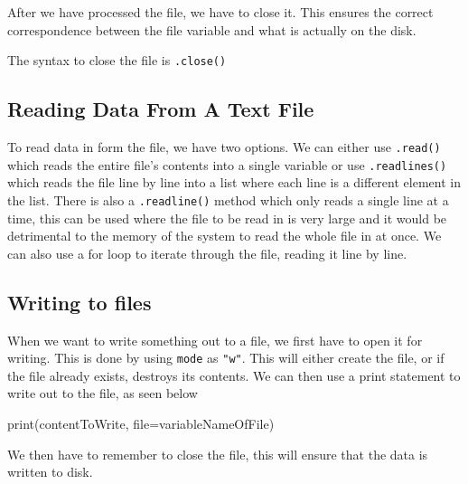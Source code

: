 After we have processed the file, we have to close it. This ensures the correct correspondence between the file variable and what is actually on the disk.

The syntax to close the file is \verb|.close()|

\subsection*{Reading Data From A Text File}
To read data in form the file, we have two options. We can either use \verb|.read()| which reads the entire file's contents into a single variable or use \verb|.readlines()| which reads the file line by line into a list where each line is a different element in the list. There is also a \verb|.readline()| method which only reads a single line at a time, this can be used where the file to be read in is very large and it would be detrimental to the memory of the system to read the whole file in at once. We can also use a for loop to iterate through the file, reading it line by line. 

\subsection*{Writing to files}
When we want to write something out to a file, we first have to open it for writing. This is done by using \verb|mode| as \verb|"w"|. This will either create the file, or if the file already exists, destroys its contents. We can then use a print statement to write out to the file, as seen below
\begin{python}
print(contentToWrite, file=variableNameOfFile)
\end{python}
We then have to remember to close the file, this will ensure that the data is written to disk.